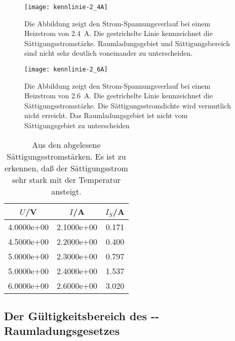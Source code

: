 \begin{figure}
  \centering
  \texttt{[image: kennlinie-2\_4A]}
  \caption{Die Abbildung zeigt den Strom-Spannungsverlauf bei einem
    Heizstrom von \SI{2.4}{\ampere}. Die gestrichelte Linie kennzeichnet
    die Sättigungsstromstärke. Raumladungsgebiet und Sättigungsbereich
    sind nicht sehr deutlich voneinander zu unterscheiden.}
  \label{fig:kennlinie-2_4A}
\end{figure}

\begin{figure}
  \centering
  \texttt{[image: kennlinie-2\_6A]}
  \caption{Die Abbildung zeigt den Strom-Spannungsverlauf bei einem
    Heizstrom von \SI{2.6}{\ampere}. Die gestrichelte Linie kennzeichnet
    die Sättigungsstromstärke. Die Sättigungsstromdichte wird vermutlich
    nicht erreicht. Das Raumladungsgebiet ist nicht vom Sättigungsgebiet
    zu unterscheiden}
  \label{fig:kennlinie-2_6A}
\end{figure}

\begin{table}
  \centering
  \begin{tabular}{SSS}
    \toprule
    {$U$/V} & {$I$/A} & {$I_S$/A} \\
    \midrule
    4.0000e+00 & 2.1000e+00 & 0.171 \\
    4.5000e+00 & 2.2000e+00 & 0.400 \\
    5.0000e+00 & 2.3000e+00 & 0.797 \\
    5.0000e+00 & 2.4000e+00 & 1.537 \\
    6.0000e+00 & 2.6000e+00 & 3.020 \\
    \bottomrule
  \end{tabular}
  \caption{Aus den 
    abgelesene Sättigungsstromstärken. Es ist zu erkennen, daß der
    Sättigungsstrom sehr stark mit der Temperatur ansteigt.}
  \label{tab:saettigung}
\end{table}

\subsection{Der Gültigkeitsbereich des
  --Raumladungsgesetzes}

